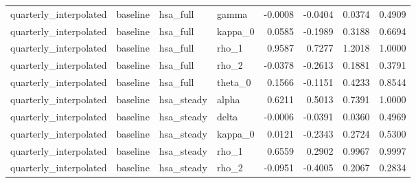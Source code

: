 \begin{tabular}{llllrrrr}
quarterly\_interpolated & baseline & hsa\_full & gamma & -0.0008 & -0.0404 & 0.0374 & 0.4909 \\
quarterly\_interpolated & baseline & hsa\_full & kappa\_0 & 0.0585 & -0.1989 & 0.3188 & 0.6694 \\
quarterly\_interpolated & baseline & hsa\_full & rho\_1 & 0.9587 & 0.7277 & 1.2018 & 1.0000 \\
quarterly\_interpolated & baseline & hsa\_full & rho\_2 & -0.0378 & -0.2613 & 0.1881 & 0.3791 \\
quarterly\_interpolated & baseline & hsa\_full & theta\_0 & 0.1566 & -0.1151 & 0.4233 & 0.8544 \\
quarterly\_interpolated & baseline & hsa\_steady & alpha & 0.6211 & 0.5013 & 0.7391 & 1.0000 \\
quarterly\_interpolated & baseline & hsa\_steady & delta & -0.0006 & -0.0391 & 0.0360 & 0.4969 \\
quarterly\_interpolated & baseline & hsa\_steady & kappa\_0 & 0.0121 & -0.2343 & 0.2724 & 0.5300 \\
quarterly\_interpolated & baseline & hsa\_steady & rho\_1 & 0.6559 & 0.2902 & 0.9967 & 0.9997 \\
quarterly\_interpolated & baseline & hsa\_steady & rho\_2 & -0.0951 & -0.4005 & 0.2067 & 0.2834 \\
\bottomrule
\end{tabular}
